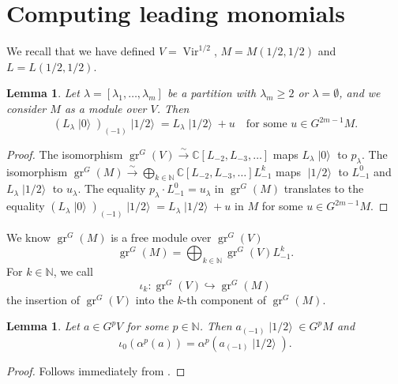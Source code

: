 \documentclass[a4paper, 12pt, reqno]{amsart}
\newtheorem{lemma}[theorem]{Lemma}
\theoremstyle{remark}
\DeclareMathOperator{\Vir}{Vir}
\DeclareMathOperator{\gr}{gr}
\DeclareMathOperator{\vac}{|0\rangle}
\DeclareMathOperator{\vachalf}{|1/2\rangle}
\begin{document}
\section{Computing leading monomials}
\label{sec:comp-lead-monom}

We recall that we have defined $V = \Vir^{1/2}$, $M = M(1/2, 1/2)$ and $L = L(1/2, 1/2)$.

\begin{lemma}
  \label{lmm:7}
  Let $\lambda = [\lambda_1, \dots, \lambda_m]$ be a partition with $\lambda_m \ge 2$ or $\lambda = \emptyset$, and we consider $M$ as a module over $V$.
  Then
  \begin{equation*}
    (L_{\lambda}\vac)_{(-1)}\vachalf = L_{\lambda}\vachalf + u \quad \text{for some $u \in G^{2m - 1}M$}.
  \end{equation*}
\end{lemma}

\begin{proof}
  The isomorphism $\gr^G(V) \xrightarrow{\sim} \mathbb{C}[L_{-2}, L_{-3}, \dots]$ maps $L_{\lambda}\vac$ to $p_{\lambda}$.
  The isomorphism $\gr^G(M) \xrightarrow{\sim} \bigoplus_{k \in \mathbb{N}}\mathbb{C}[L_{-2}, L_{-3}, \dots]L_{-1}^k$ maps $\vachalf$ to $L_{-1}^0$ and $L_{\lambda}\vachalf$ to $u_{\lambda}$.
  The equality $p_{\lambda}\cdot L_{-1}^0 = u_{\lambda}$ in $\gr^G(M)$ translates to the equality $(L_{\lambda}\vac)_{(-1)}\vachalf = L_{\lambda}\vachalf + u$ in $M$ for some $u \in G^{2m - 1}M$.
\end{proof}

We know $\gr^G(M)$ is a free module over $\gr^G(V)$
\begin{equation*}
  \gr^G(M) = \bigoplus_{k \in \mathbb{N}}\gr^G(V)L_{-1}^k.
\end{equation*}
For $k \in \mathbb{N}$, we call
\begin{equation*}
  \iota_k: \gr^G(V) \hookrightarrow \gr^G(M)
\end{equation*}
the insertion of $\gr^G(V)$ into the $k$-th component of $\gr^G(M)$.

\begin{lemma}
  \label{lmm:8}
  Let $a \in G^pV$ for some $p \in \mathbb{N}$.
  Then $a_{(-1)}\vachalf \in G^pM$ and
  \begin{equation*}
    \iota_0(\alpha^p(a)) = \alpha^p(a_{(-1)}\vachalf).
  \end{equation*}
\end{lemma}

\begin{proof}
  Follows immediately from .
\end{proof}
\end{document}
